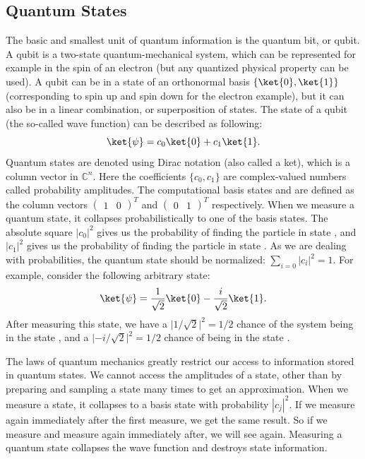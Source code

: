 \documentclass[a4paper,10pt]{article}
\begin{document}
\subsection{Quantum States}
The basic and smallest unit of quantum information is the quantum bit, or qubit.
A qubit is a two-state quantum-mechanical system, which can be represented for example in the spin of an electron (but any quantized physical property can be used).
A qubit can be in a state of an orthonormal basis $\{\ket{0}, \ket{1}\}$ (corresponding to spin up and spin down for the electron example), but it can also be in a linear combination, or superposition of states.
The state of a qubit (the so-called wave function) can be described as following:
\begin{equation}
\ket{\psi} = c_0\ket{0} + c_1\ket{1}.
\end{equation}
Quantum states are denoted using Dirac notation \ket{\,\cdotp\,} (also called a ket), which is a column vector in $\mathbb{C}^n$.
Here the coefficients $\{c_0, c_1\}$ are complex-valued numbers called probability amplitudes.
The computational basis states  and  are defined as the column vectors $(\begin{matrix}1 & 0\end{matrix})^T$ and $(\begin{matrix}0 & 1\end{matrix})^T$ respectively.
When we measure a quantum state, it collapses probabilistically to one of the basis states.
The absolute square $|c_0|^2$ gives us the probability of finding the particle in state , and $|c_1|^2$ gives us the probability of finding the particle in state .
As we are dealing with probabilities, the quantum state should be normalized: $\sum_{i=0}|c_i|^2 = 1$.
For example, consider the following arbitrary state:
\begin{equation} \label{eq:arbitary_state_example}
\ket{\psi} = \dfrac{1}{\sqrt2}\ket{0} - \dfrac{i}{\sqrt2}\ket{1}.
\end{equation}
After measuring this state, we have a $\lvert1/\sqrt2\rvert^2 = 1/2$ chance of the system being in the state , and a $\lvert{-}i/\sqrt2\rvert^2 = 1/2$ chance of being in the state .

The laws of quantum mechanics greatly restrict our access to information stored in quantum states.
We cannot access the amplitudes of a state, other than by preparing and sampling a state many times to get an approximation. 
When we measure a state, it collapses to a basis state  with probability $|c_j|^2$.
If we measure again immediately after the first measure, we get the same result.
So if we measure  and measure again immediately after, we will see  again.
Measuring a quantum state collapses the wave function and destroys state information.
\end{document}
